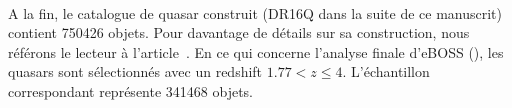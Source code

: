 \documentclass[11pt, twoside, a4paper, openright]{report}
\begin{document}
\paragraph{}
A la fin, le catalogue de quasar construit (DR16Q dans la suite de ce manuscrit) contient \num{750426} objets. Pour davantage de détails sur sa construction, nous référons le lecteur à l'article~\cite{CITE:Lyke in prep}. En ce qui concerne l'analyse \lya{} finale d'eBOSS (\cite{CITE:dr16}), les quasars sont sélectionnés avec un redshift $1.77 < z \leq 4$. L'échantillon correspondant représente \num{341468} objets.




\end{document}
